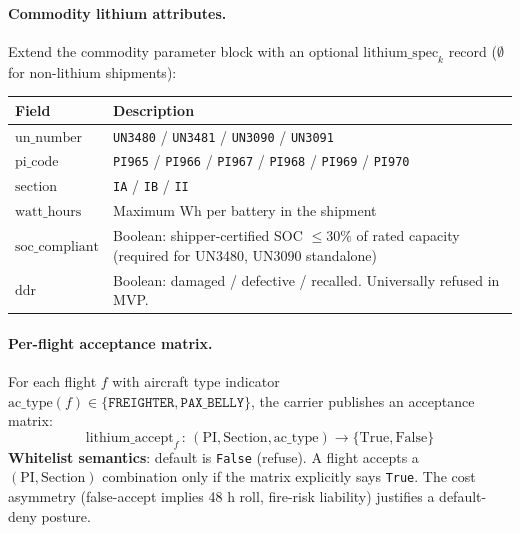 \documentclass[11pt,a4paper]{article}
\theoremstyle{definition}
\begin{document}
\paragraph{Commodity lithium attributes.}
Extend the commodity parameter block with an optional \(\text{lithium\_spec}_k\)
record (\(\emptyset\) for non-lithium shipments):
\begin{center}
\begin{tabular}{lp{9cm}}
\toprule
Field & Description \\
\midrule
\(\text{un\_number}\) & \texttt{UN3480} / \texttt{UN3481} / \texttt{UN3090} / \texttt{UN3091} \\
\(\text{pi\_code}\) & \texttt{PI965} / \texttt{PI966} / \texttt{PI967} / \texttt{PI968} / \texttt{PI969} / \texttt{PI970} \\
\(\text{section}\) & \texttt{IA} / \texttt{IB} / \texttt{II} \\
\(\text{watt\_hours}\) & Maximum Wh per battery in the shipment \\
\(\text{soc\_compliant}\) & Boolean: shipper-certified SOC \(\leq 30\%\) of rated capacity
                              (required for UN3480, UN3090 standalone) \\
\(\text{ddr}\) & Boolean: damaged / defective / recalled. Universally refused in MVP. \\
\bottomrule
\end{tabular}
\end{center}

\paragraph{Per-flight acceptance matrix.}
For each flight \(f\) with aircraft type indicator
\(\text{ac\_type}(f) \in \{\texttt{FREIGHTER}, \texttt{PAX\_BELLY}\}\), the carrier
publishes an acceptance matrix:
\begin{equation}
  \text{lithium\_accept}_f \,:\, (\text{PI}, \text{Section}, \text{ac\_type}) \to \{\text{True}, \text{False}\}
  \label{eq:lithium-accept}
\end{equation}
\textbf{Whitelist semantics}: default is \texttt{False} (refuse). A flight accepts a
\((\text{PI}, \text{Section})\) combination only if the matrix explicitly says
\texttt{True}. The cost asymmetry (false-accept implies 48 h roll, fire-risk
liability) justifies a default-deny posture.
\end{document}
